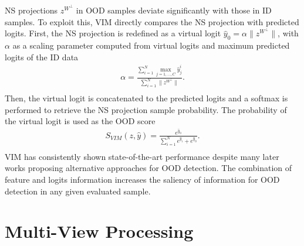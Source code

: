 NS projections $z^{W^{\perp}}$ in OOD samples deviate significantly with those in ID samples. To exploit this, VIM directly compares the NS projection with predicted logits. First, the NS projection is redefined as a virtual logit $\hat{y}_0 = \alpha \| z^{W^{\perp}} \|$, with $\alpha$ as a scaling parameter computed from virtual logits and maximum predicted logits of the ID data
\begin{equation}
\begin{aligned}
    \alpha = \frac{\sum_{i=1}^{N} \max_{j=1,\dots,C} \hat{y}_j^i}{\sum_{i=1}^{N} \| z^{W^{\perp}} \|}. \\
\end{aligned}
\end{equation}
Then, the virtual logit is concatenated to the predicted logits and a softmax is performed to retrieve the NS projection sample probability. The probability of the virtual logit is used as the OOD score
\begin{equation}
\begin{aligned}
    S_{VIM}(z,\hat{y}) = \frac{e^{\hat{y}_0}}{\sum_{i=1}^{N} e^{\hat{y}_i} + e^{\hat{y}_0}}. \\
\end{aligned}
\end{equation}
VIM has consistently shown state-of-the-art performance despite many later works proposing alternative approaches for OOD detection. The combination of feature and logits information increases the saliency of information for OOD detection in any given evaluated sample.

\section{Multi-View Processing}
\label{sec:bkgd-mvp}

